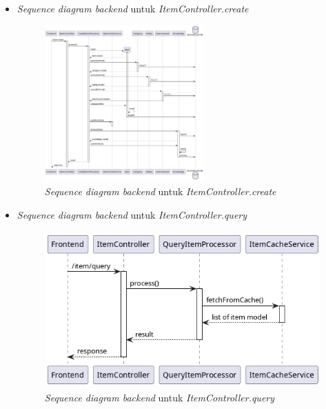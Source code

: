 \documentclass[a4paper]{article}
\begin{document}
\begin{enumerate}
\begin{enumerate}
\begin{itemize}
            \newpage
            \item \textit{Sequence diagram backend} untuk \textit{ItemController.create}
            \begin{figure}[h]
                \centering
                \includegraphics*[height=6cm]{diagram/sequence diagram/BE/item controller/create/create.png}
                \caption{\textit{Sequence diagram backend} untuk \textit{ItemController.create}}
            \end{figure}

            \item \textit{Sequence diagram backend} untuk \textit{ItemController.query}
            \begin{figure}[h]
                \centering
                \includegraphics*[height=6cm]{diagram/sequence diagram/BE/item controller/query/query.png}
                \caption{\textit{Sequence diagram backend} untuk \textit{ItemController.query}}
            \end{figure}


\end{itemize}
\end{enumerate}
\end{enumerate}
\end{document}
